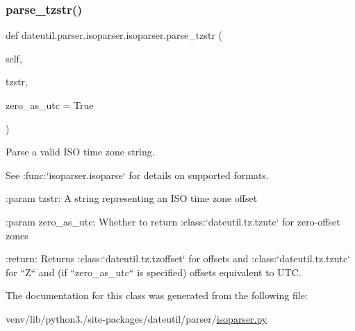 \subsubsection{\texorpdfstring{parse\+\_\+tzstr()}{parse\_tzstr()}}
{\footnotesize\ttfamily def dateutil.\+parser.\+isoparser.\+isoparser.\+parse\+\_\+tzstr (\begin{DoxyParamCaption}\item[{}]{self,  }\item[{}]{tzstr,  }\item[{}]{zero\+\_\+as\+\_\+utc = {\ttfamily True} }\end{DoxyParamCaption})}

\begin{DoxyVerb}Parse a valid ISO time zone string.

See :func:`isoparser.isoparse` for details on supported formats.

:param tzstr:
    A string representing an ISO time zone offset

:param zero_as_utc:
    Whether to return :class:`dateutil.tz.tzutc` for zero-offset zones

:return:
    Returns :class:`dateutil.tz.tzoffset` for offsets and
    :class:`dateutil.tz.tzutc` for ``Z`` and (if ``zero_as_utc`` is
    specified) offsets equivalent to UTC.
\end{DoxyVerb}
 

The documentation for this class was generated from the following file\+:\begin{DoxyCompactItemize}
\item 
venv/lib/python3./site-\/packages/dateutil/parser/\hyperlink{isoparser_8py}{isoparser.\+py}\end{DoxyCompactItemize}
